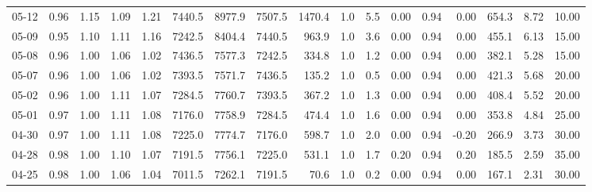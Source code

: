 \begin{threeparttable}
{\begin{tabular}{lrrrrrrrrrrrrrrrr}
  05-12 &         0.96 &           1.15 &          1.09 &          1.21 & 7440.5 & 8977.9 & 7507.5 &     1470.4 &                      1.0 &                 5.5 &       0.00 &      0.94 &           0.00 &            654.3 &            8.72 &                  10.00 \\
  05-09 &         0.95 &           1.10 &          1.11 &          1.16 & 7242.5 & 8404.4 & 7440.5 &      963.9 &                      1.0 &                 3.6 &       0.00 &      0.94 &           0.00 &            455.1 &            6.13 &                  15.00 \\
  05-08 &         0.96 &           1.00 &          1.06 &          1.02 & 7436.5 & 7577.3 & 7242.5 &      334.8 &                      1.0 &                 1.2 &       0.00 &      0.94 &           0.00 &            382.1 &            5.28 &                  15.00 \\
  05-07 &         0.96 &           1.00 &          1.06 &          1.02 & 7393.5 & 7571.7 & 7436.5 &      135.2 &                      1.0 &                 0.5 &       0.00 &      0.94 &           0.00 &            421.3 &            5.68 &                  20.00 \\
  05-02 &         0.96 &           1.00 &          1.11 &          1.07 & 7284.5 & 7760.7 & 7393.5 &      367.2 &                      1.0 &                 1.3 &       0.00 &      0.94 &           0.00 &            408.4 &            5.52 &                  20.00 \\
  05-01 &         0.97 &           1.00 &          1.11 &          1.08 & 7176.0 & 7758.9 & 7284.5 &      474.4 &                      1.0 &                 1.6 &       0.00 &      0.94 &           0.00 &            353.8 &            4.84 &                  25.00 \\
  04-30 &         0.97 &           1.00 &          1.11 &          1.08 & 7225.0 & 7774.7 & 7176.0 &      598.7 &                      1.0 &                 2.0 &       0.00 &      0.94 &          -0.20 &            266.9 &            3.73 &                  30.00 \\
  04-28 &         0.98 &           1.00 &          1.10 &          1.07 & 7191.5 & 7756.1 & 7225.0 &      531.1 &                      1.0 &                 1.7 &       0.20 &      0.94 &           0.20 &            185.5 &            2.59 &                  35.00 \\
  04-25 &         0.98 &           1.00 &          1.06 &          1.04 & 7011.5 & 7262.1 & 7191.5 &       70.6 &                      1.0 &                 0.2 &       0.00 &      0.94 &           0.00 &            167.1 &            2.31 &                  30.00 \\

\end{tabular}}
\end{threeparttable}
